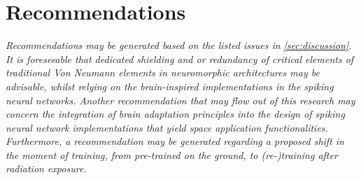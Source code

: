 \section{Recommendations}\label{sec:recommendations}
\textit{Recommendations may be generated based on the listed issues in \cref{sec:discussion}. It is foreseeable that dedicated shielding and or redundancy of critical elements of traditional Von Neumann elements in neuromorphic architectures may be advisable, whilst relying on the brain-inspired implementations in the spiking neural networks. Another recommendation that may flow out of this research may concern the integration of brain adaptation principles into the design of spiking neural network implementations that yield space application functionalities. Furthermore, a recommendation may be generated regarding a proposed shift in the moment of training, from pre-trained on the ground, to (re-)training after radiation exposure.}